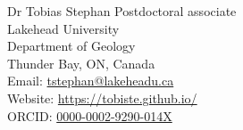 \documentclass[10pt, paper=letter]{scrartcl} %
\begin{document}

\begin{cv}{\textsf{Dr Tobias Stephan}}
    \medskip
    \noindent  Postdoctoral associate\smallskip \\
    Lakehead University\\
    Department of Geology\\
    Thunder Bay, ON, Canada\smallskip \\
    \noindent Email: \href{mailto:tstephan@lakeheadu.ca}{tstephan@lakeheadu.ca}\\
    Website: \url{https://tobiste.github.io/}\\
    ORCID: \href{https://orcid.org/0000-0002-9290-014X}{0000-0002-9290-014X}




\end{cv}
\end{document}
